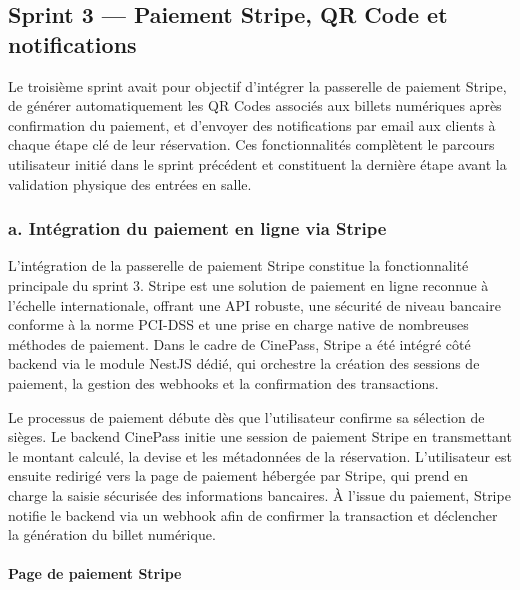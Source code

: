 \documentclass[12pt]{report}
\begin{document}
\subsection{Sprint 3 — Paiement Stripe, QR Code et notifications}

Le troisième sprint avait pour objectif d'intégrer la passerelle de paiement Stripe, de générer automatiquement les QR Codes associés aux billets numériques après confirmation du paiement, et d'envoyer des notifications par email aux clients à chaque étape clé de leur réservation. Ces fonctionnalités complètent le parcours utilisateur initié dans le sprint précédent et constituent la dernière étape avant la validation physique des entrées en salle.

\subsubsection{a. \quad Intégration du paiement en ligne via Stripe}

L'intégration de la passerelle de paiement Stripe constitue la fonctionnalité principale du sprint 3. Stripe est une solution de paiement en ligne reconnue à l'échelle internationale, offrant une API robuste, une sécurité de niveau bancaire conforme à la norme PCI-DSS et une prise en charge native de nombreuses méthodes de paiement. Dans le cadre de CinePass, Stripe a été intégré côté backend via le module NestJS dédié, qui orchestre la création des sessions de paiement, la gestion des webhooks et la confirmation des transactions.

Le processus de paiement débute dès que l'utilisateur confirme sa sélection de sièges. Le backend CinePass initie une session de paiement Stripe en transmettant le montant calculé, la devise et les métadonnées de la réservation. L'utilisateur est ensuite redirigé vers la page de paiement hébergée par Stripe, qui prend en charge la saisie sécurisée des informations bancaires. À l'issue du paiement, Stripe notifie le backend via un webhook afin de confirmer la transaction et déclencher la génération du billet numérique.

\paragraph{Page de paiement Stripe}
\end{document}

